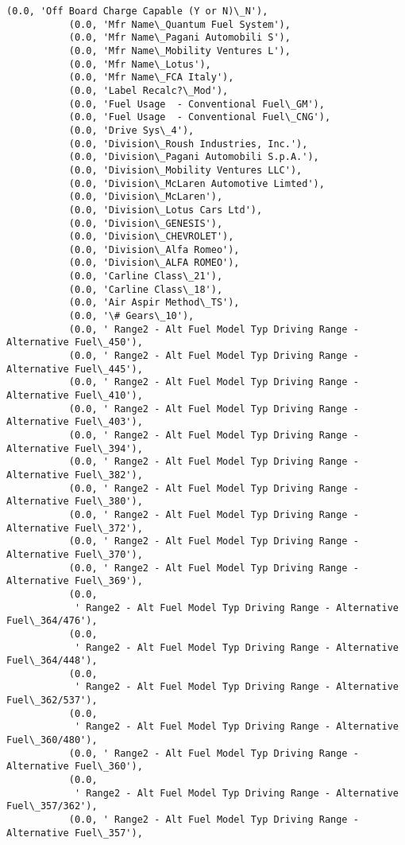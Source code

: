 \documentclass[11pt]{article}
\begin{document}
\begin{Verbatim}[commandchars=\\\{\}]
           (0.0, 'Off Board Charge Capable (Y or N)\_N'),
           (0.0, 'Mfr Name\_Quantum Fuel System'),
           (0.0, 'Mfr Name\_Pagani Automobili S'),
           (0.0, 'Mfr Name\_Mobility Ventures L'),
           (0.0, 'Mfr Name\_Lotus'),
           (0.0, 'Mfr Name\_FCA Italy'),
           (0.0, 'Label Recalc?\_Mod'),
           (0.0, 'Fuel Usage  - Conventional Fuel\_GM'),
           (0.0, 'Fuel Usage  - Conventional Fuel\_CNG'),
           (0.0, 'Drive Sys\_4'),
           (0.0, 'Division\_Roush Industries, Inc.'),
           (0.0, 'Division\_Pagani Automobili S.p.A.'),
           (0.0, 'Division\_Mobility Ventures LLC'),
           (0.0, 'Division\_McLaren Automotive Limted'),
           (0.0, 'Division\_McLaren'),
           (0.0, 'Division\_Lotus Cars Ltd'),
           (0.0, 'Division\_GENESIS'),
           (0.0, 'Division\_CHEVROLET'),
           (0.0, 'Division\_Alfa Romeo'),
           (0.0, 'Division\_ALFA ROMEO'),
           (0.0, 'Carline Class\_21'),
           (0.0, 'Carline Class\_18'),
           (0.0, 'Air Aspir Method\_TS'),
           (0.0, '\# Gears\_10'),
           (0.0, ' Range2 - Alt Fuel Model Typ Driving Range - Alternative Fuel\_450'),
           (0.0, ' Range2 - Alt Fuel Model Typ Driving Range - Alternative Fuel\_445'),
           (0.0, ' Range2 - Alt Fuel Model Typ Driving Range - Alternative Fuel\_410'),
           (0.0, ' Range2 - Alt Fuel Model Typ Driving Range - Alternative Fuel\_403'),
           (0.0, ' Range2 - Alt Fuel Model Typ Driving Range - Alternative Fuel\_394'),
           (0.0, ' Range2 - Alt Fuel Model Typ Driving Range - Alternative Fuel\_382'),
           (0.0, ' Range2 - Alt Fuel Model Typ Driving Range - Alternative Fuel\_380'),
           (0.0, ' Range2 - Alt Fuel Model Typ Driving Range - Alternative Fuel\_372'),
           (0.0, ' Range2 - Alt Fuel Model Typ Driving Range - Alternative Fuel\_370'),
           (0.0, ' Range2 - Alt Fuel Model Typ Driving Range - Alternative Fuel\_369'),
           (0.0,
            ' Range2 - Alt Fuel Model Typ Driving Range - Alternative Fuel\_364/476'),
           (0.0,
            ' Range2 - Alt Fuel Model Typ Driving Range - Alternative Fuel\_364/448'),
           (0.0,
            ' Range2 - Alt Fuel Model Typ Driving Range - Alternative Fuel\_362/537'),
           (0.0,
            ' Range2 - Alt Fuel Model Typ Driving Range - Alternative Fuel\_360/480'),
           (0.0, ' Range2 - Alt Fuel Model Typ Driving Range - Alternative Fuel\_360'),
           (0.0,
            ' Range2 - Alt Fuel Model Typ Driving Range - Alternative Fuel\_357/362'),
           (0.0, ' Range2 - Alt Fuel Model Typ Driving Range - Alternative Fuel\_357'),

\end{Verbatim}
\end{document}
